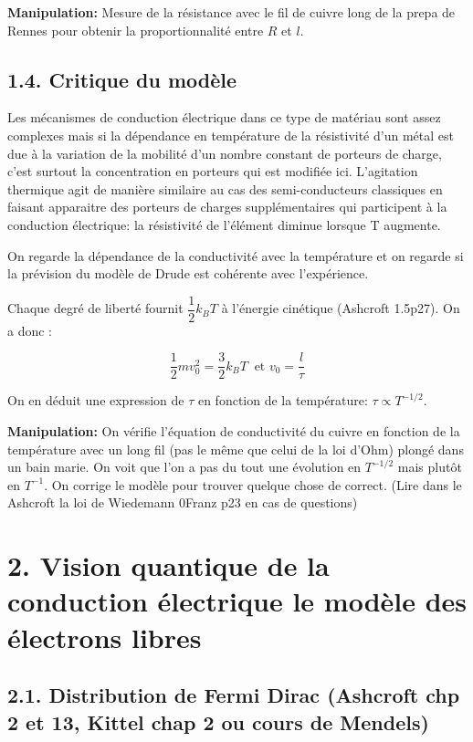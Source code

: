 \documentclass[french, a4paper, 10pt, twocolumn, landscape]{article}
\begin{document}
\textbf{Manipulation:} Mesure de la résistance avec le fil de cuivre long de la prepa de Rennes pour obtenir la proportionnalité entre $R$ et $l$.

\subsection*{1.4. Critique du modèle}

Les mécanismes de conduction électrique dans ce type de matériau sont assez complexes mais si la dépendance en température de la résistivité d’un métal est due à la variation de la mobilité d’un nombre constant de porteurs de charge, c’est surtout la concentration en porteurs qui est modifiée ici. L’agitation thermique agit de manière similaire au cas des semi-conducteurs classiques en faisant apparaitre des porteurs de charges supplémentaires qui participent à la conduction électrique:  la résistivité de l’élément diminue lorsque T augmente.\medskip

On regarde la dépendance de la conductivité avec la température et on regarde si la prévision du modèle de Drude est cohérente avec l'expérience.\medskip

Chaque degré de liberté fournit $\dfrac{1}{2}k_BT$ à l'énergie cinétique (Ashcroft 1.5p27). On a donc : 

\begin{equation}
    \dfrac{1}{2}mv_0^2=\dfrac{3}{2}k_BT~\text{ et } v_0=\dfrac{l}{\tau}
\end{equation}

On en déduit une expression de $\tau$ en fonction de la température: $\tau\propto T^{-1/2}$. 

\textbf{Manipulation: } On vérifie l'équation de conductivité du cuivre en fonction de la température avec un long fil (pas le même que celui de la loi d'Ohm) plongé dans un bain marie. On voit que l'on a pas du tout une évolution en $T^{-1/2}$ mais plutôt en $T^{-1}$. On corrige le modèle pour trouver quelque chose de correct. (Lire dans le Ashcroft la loi de Wiedemann 0Franz p23 en cas de questions)

\section*{2. Vision quantique de la conduction électrique le modèle des électrons libres}

\subsection*{2.1. Distribution de Fermi Dirac (Ashcroft chp 2 et 13, Kittel chap 2 ou cours de Mendels)}
\end{document}
